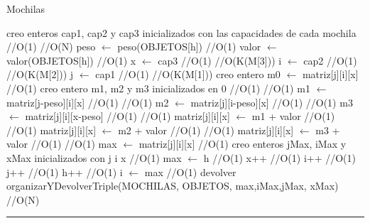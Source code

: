 \begin{algorithm}[H]
\caption{Mochilas}
\begin{algorithmic}[1]
\state creo enteros cap1, cap2 y cap3 inicializados con las capacidades de cada mochila \hfill //O(1)
 \hfill //O(N)
\state peso $\gets$ peso(OBJETOS[h]) \hfill //O(1)
\state valor $\gets$ valor(OBJETOS[h]) \hfill //O(1)
\state x $\gets$  cap3  \hfill //O(1)
 \hfill //O(K(M[3]))
\state i $\gets$  cap2  \hfill //O(1)
 \hfill //O(K(M[2]))
\state j $\gets$  cap1  \hfill //O(1)
 \hfill //O(K(M[1]))
\state creo entero m0 $\gets$ matriz[j][i][x] \hfill //O(1)
\state creo entero m1, m2 y m3 inicializados en 0 \hfill //O(1)
 \hfill //O(1)
\state m1 $\gets$ matriz[j-peso][i][x] \hfill //O(1)
\endif
{} \hfill //O(1)
\state m2 $\gets$ matriz[j][i-peso][x] \hfill //O(1)
\endif
{} \hfill //O(1)
\state m3 $\gets$ matriz[j][i][x-peso] \hfill //O(1)
\endif
{} \hfill //O(1)
\state matriz[j][i][x] $\gets$ m1 + valor \hfill //O(1)
\endif
{} \hfill //O(1)
\state matriz[j][i][x] $\gets$ m2 + valor \hfill //O(1)
\endif
{} \hfill //O(1)
\state matriz[j][i][x] $\gets$ m3 + valor \hfill //O(1)
\endif
{} \hfill //O(1)
\state max $\gets$ matriz[j][i][x] \hfill //O(1)
\state creo enteros jMax, iMax y xMax inicializados con j i x \hfill //O(1)
\state max $\gets$ h \hfill //O(1)
\endif
\state x++ \hfill //O(1)
\endwhile
\state i++ \hfill //O(1)
\endwhile
\state j++ \hfill //O(1)
\endwhile
\state h++ \hfill //O(1)
\endwhile
\state i $\gets$ max \hfill //O(1)
\state devolver organizarYDevolverTriple(MOCHILAS, OBJETOS, max,iMax,jMax, xMax) \hfill //O(N)
\EndFunction 
\end{algorithmic}
\hrule
{}
\end{algorithm}


